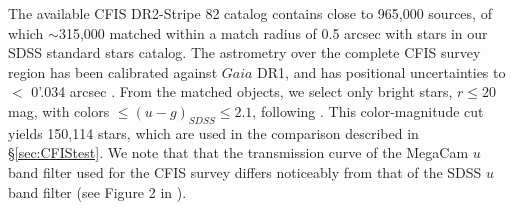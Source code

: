 \documentclass{aastex63}
\begin{document}
The available CFIS DR2-Stripe 82 catalog contains close to 965,000 sources, of which $\sim$315,000 matched within 
a match radius of 0.5 arcsec with stars in our SDSS standard stars catalog. The astrometry over the complete CFIS survey 
region has been calibrated against $Gaia$ DR1, and has positional uncertainties to $<$ 0'.034 arcsec 
\citep{2017ApJ...848..128I}.  From the matched objects, we select only bright stars, $r \leq 20$ mag,  with colors  
$\leq (u-g)_{SDSS} \leq 2.1$, following \cite{2017ApJ...848..128I}. This color-magnitude cut yields 150,114 stars, which 
are used in the comparison described in \S \ref{sec:CFIStest}.  We note that that the transmission curve of the MegaCam 
$u$ band filter used for the CFIS survey differs noticeably from that of the SDSS $u$ band filter (see Figure 2 in \citealt{2017ApJ...848..128I}).  
   







\end{document}
